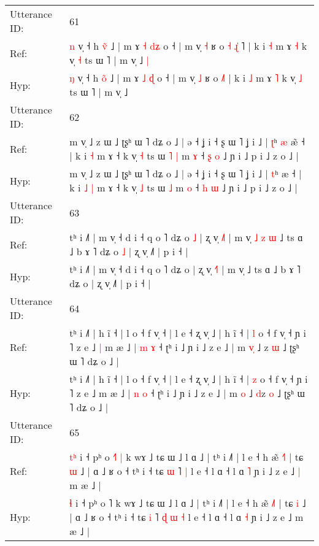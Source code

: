 \documentclass[10pt]{article}
\DeclareRobustCommand{\hl}[1]{{\textcolor{red}{#1}}}
\begin{document}
\begin{longtable}{ll}
 \\
\midrule
Utterance ID: & 61 \\
Ref: & \hl{n} v̩ ˧ h \hl{v}̃ ˩ | m ɤ \hl{˧} \hl{d}\hl{ʑ} o ˧ | m v̩ \hl{˧} ʁ o\hl{ }\hl{˧} \hl{ɻ}\hl{̍}\hl{ }˥ | k i \hl{˧} m ɤ \hl{˧} k v̩ \hl{˧} ts ɯ ˥ | m v̩ ˩\hl{ }\hl{|}
 \\
Hyp: & \hl{ŋ} v̩ ˧ h \hl{o}̃ ˩ | m ɤ \hl{˩} \hl{}\hl{ɖ} o ˧ | m v̩ \hl{˩} ʁ o\hl{}\hl{} \hl{}\hl{}\hl{˩}˥ | k i \hl{˩} m ɤ \hl{˥} k v̩ \hl{˩} ts ɯ ˥ | m v̩ ˩\hl{}\hl{}
 \\
\midrule
Utterance ID: & 62 \\
Ref: & m v̩ ˩ z ɯ ˩ ʈʂʰ ɯ ˥ dʑ o ˩ | ə ˧ ʝ i ˧ ʂ ɯ ˥ ʝ i ˩ | \hl{ʈ}ʰ\hl{ }\hl{æ} æ\hl{̃} ˧ | k i\hl{}\hl{} \hl{˧} m ɤ ˧ k v̩ \hl{˧} ts ɯ\hl{ }\hl{˥} \hl{|} m \hl{ɤ} ˧ \hl{ʂ} \hl{o} ˩ ɲ i ˩ p i ˩ z o ˩ |
 \\
Hyp: & m v̩ ˩ z ɯ ˩ ʈʂʰ ɯ ˥ dʑ o ˩ | ə ˧ ʝ i ˧ ʂ ɯ ˥ ʝ i ˩ | \hl{t}ʰ\hl{}\hl{} æ\hl{} ˧ | k i\hl{ }\hl{˩} \hl{|} m ɤ ˧ k v̩ \hl{˩} ts ɯ\hl{}\hl{} \hl{˩} m \hl{o} ˧ \hl{h} \hl{ɯ} ˩ ɲ i ˩ p i ˩ z o ˩ |
 \\
\midrule
Utterance ID: & 63 \\
Ref: & tʰ i ˩˥ | m v̩ ˧ d i ˧ q o ˥ dʑ o\hl{ }\hl{˩} | ʐ v̩ \hl{˩}˥ | m v̩\hl{ }\hl{˩}\hl{ }\hl{z}\hl{ }\hl{ɯ} ˩ ts ɑ ˩ b ɤ ˥ dʑ o\hl{ }\hl{˩} | ʐ v̩ ˩˥ | p i ˧ |
 \\
Hyp: & tʰ i ˩˥ | m v̩ ˧ d i ˧ q o ˥ dʑ o\hl{}\hl{} | ʐ v̩ \hl{˧}˥ | m v̩\hl{}\hl{}\hl{}\hl{}\hl{}\hl{} ˩ ts ɑ ˩ b ɤ ˥ dʑ o\hl{}\hl{} | ʐ v̩ ˩˥ | p i ˧ |
 \\
\midrule
Utterance ID: & 64 \\
Ref: & tʰ i ˩˥ | h ĩ ˧ | l o ˧ f v̩ ˧ | l e ˧ ʐ v̩ ˩ | h ĩ ˧ | \hl{l} o ˧ f v̩ ˧ ɲ i ˥ z e ˩\hl{ }\hl{|} m æ ˩ | \hl{m} \hl{ɤ} ˧ ʈʰ i ˩ ɲ i ˩ z e ˩ | m \hl{v}\hl{̩} ˩ \hl{}z \hl{ɯ} ˩ ʈʂʰ ɯ ˥ dʑ o ˩ |
 \\
Hyp: & tʰ i ˩˥ | h ĩ ˧ | l o ˧ f v̩ ˧ | l e ˧ ʐ v̩ ˩ | h ĩ ˧ | \hl{z} o ˧ f v̩ ˧ ɲ i ˥ z e ˩\hl{}\hl{} m æ ˩ | \hl{n} \hl{o} ˧ ʈʰ i ˩ ɲ i ˩ z e ˩ | m \hl{}\hl{o} ˩ \hl{d}z \hl{o} ˩ ʈʂʰ ɯ ˥ dʑ o ˩ |
 \\
\midrule
Utterance ID: & 65 \\
Ref: & \hl{t}\hl{ʰ} i ˧ pʰ o \hl{˧}˥\hl{ }\hl{|} k wɤ ˩ tɕ ɯ ˩ l ɑ ˩ | tʰ i ˩˥ | l e ˧ h æ̃ \hl{˧}˥ | tɕ \hl{ɯ} ˩ | ɑ ˩ ʁ o ˧ tʰ i ˧ tɕ \hl{ɯ} ˥\hl{}\hl{}\hl{}\hl{} \hl{|} l e ˧ l ɑ ˧ l ɑ \hl{˥} ɲ i ˩ z e ˩\hl{ }\hl{|} m æ ˩ |
 \\
Hyp: & \hl{}\hl{ɬ} i ˧ pʰ o \hl{}˥\hl{}\hl{} k wɤ ˩ tɕ ɯ ˩ l ɑ ˩ | tʰ i ˩˥ | l e ˧ h æ̃ \hl{˩}˥ | tɕ \hl{i} ˩ | ɑ ˩ ʁ o ˧ tʰ i ˧ tɕ \hl{i} ˥\hl{ }\hl{ɖ}\hl{ }\hl{ɯ} \hl{˧} l e ˧ l ɑ ˧ l ɑ \hl{˧} ɲ i ˩ z e ˩\hl{}\hl{} m æ ˩ |

\end{longtable}
\end{document}
